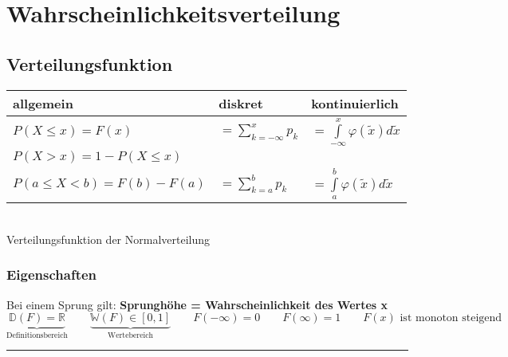 \section{Wahrscheinlichkeitsverteilung}

\subsection{Verteilungsfunktion}
\begin{minipage}{0.6\textwidth}
	\begin{tabular}{|l|l|l|}
		\hline
		\textbf{allgemein} & \textbf{diskret} & \textbf{kontinuierlich}\\
		\hline
		\hline
		$P(X\leq x)=F(x)$ & $=\sum\limits_{k=-\infty}^x p_k$ &
		$=\int\limits_{-\infty}^x \varphi(\tilde{x})d\tilde{x}$\\
		
		$P(X>x)=1-P(X\leq x)$ & & \\        	
		$P(a \le X < b)=F(b)-F(a)$ & $=\sum\limits_{k=a}^b p_k$ &
		$=\int \limits_a^b \varphi(\tilde{x})d\tilde{x}$\\
		\hline
	\end{tabular}
\end{minipage}
\begin{minipage}{0.4\textwidth}
	\\
	Verteilungsfunktion der Normalverteilung
\end{minipage}


\subsubsection{Eigenschaften}
Bei einem Sprung gilt: \textbf{Sprunghöhe = Wahrscheinlichkeit des Wertes x}\\
$$\underbrace{\boxed{\mathbb{D}(F) = \mathbb{R}}}_{\text{Definitionsbereich}} \qquad \underbrace{\boxed{\mathbb{W}(F) \in[0,1]}}_{\text{Wertebereich}} \qquad \boxed{F(-\infty)=0} \qquad  \boxed{F(\infty)=1}
\qquad \boxed{F(x) \text{ ist monoton steigend}}$$

\hrule

